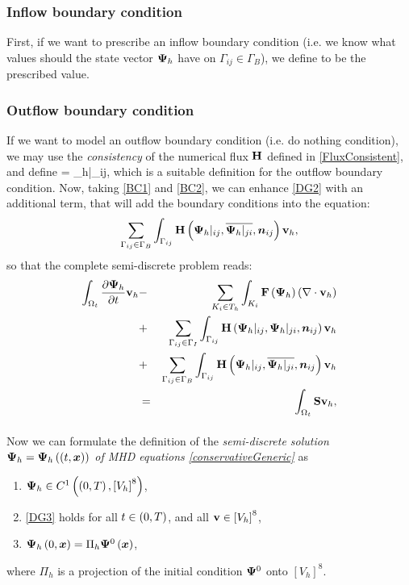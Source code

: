 \subsubsection{Inflow boundary condition}
First, if we want to prescribe an inflow boundary condition (i.e. we know what values should the state vector $\mathrm{\mathbf{\Psi}}_h$ have on ${\Gamma_{ij}}\in\Gamma_B$), we define
\be
\label{BC1} 
\ee
to be the prescribed value.

\subsubsection{Outflow boundary condition}
If we want to model an outflow boundary condition (i.e. do nothing condition), we may use the \textit{consistency} of the numerical flux $\mathrm{\mathbf{H}}$ defined in \ref{FluxConsistent}, and define
\be
\label{BC2}  = {\mrPsi_h}|_{ij},
\ee
which is a suitable definition for the outflow boundary condition.
Now, taking \ref{BC1} and \ref{BC2}, we can enhance \ref{DG2} with an additional term, that will add the boundary conditions into the equation:
$$
\sum_{\Gamma_{ij}\in\Gamma_B} \int_{\Gamma_{ij}} \mathrm{\mathbf{H}}\left({\mathrm{\mathbf{\Psi}}_h}|_{ij}, \overline{{\mathrm{\mathbf{\Psi}}_h}|_{ji}}, \mbox{\boldmath $n$}_{ij}\right) \mathrm{\mathbf{v}}_h,
$$
so that the complete semi-discrete problem reads:
\begin{eqnarray}
\label{DG3} \int_{\Omega_{t}} \frac{\partial{{\mathrm{\mathbf{\Psi}}_h}}}{\partial{t}} \mathrm{\mathbf{v}}_h & - & \sum_{K_i \in T_h}\int_{K_i}\mathrm{\mathbf{F}}\left({\mathrm{\mathbf{\Psi}}_h}\right) \left(\nabla \cdot \mathrm{\mathbf{v}}_h\right)\\ \nonumber & + & \sum_{\Gamma_{ij}\in\Gamma_I} \int_{\Gamma_{ij}} \mathrm{\mathbf{H}}\left({\mathrm{\mathbf{\Psi}}_h}|_{ij}, {\mathrm{\mathbf{\Psi}}_h}|_{ji}, \mbox{\boldmath $n$}_{ij}\right) \mathrm{\mathbf{v}}_h\\\nonumber
 & + & \sum_{\Gamma_{ij}\in\Gamma_B} \int_{\Gamma_{ij}} \mathrm{\mathbf{H}}\left({\mathrm{\mathbf{\Psi}}_h}|_{ij}, \overline{{\mathrm{\mathbf{\Psi}}_h}|_{ji}}, \mbox{\boldmath $n$}_{ij}\right) \mathrm{\mathbf{v}}_h\\\nonumber
 & = & \int_{\Omega_{t}} \mathrm{\mathbf{S}} \mathrm{\mathbf{v}}_h,
\end{eqnarray}

\paragraph{}
Now we can formulate the definition of the \textit{semi-discrete solution ${\mathrm{\mathbf{\Psi}}_h} = {\mathrm{\mathbf{\Psi}}_h}\left((t, \mbox{\boldmath $x$}\right))$ of MHD equations \ref{conservativeGeneric}} as
\begin{enumerate}
    \label{discreteSlnDef}
    \item ${\mathrm{\mathbf{\Psi}}_h} \in C^{1}\left(\left(0, T\right), \left[V_h\right]^8\right)$,
    \item \ref{DG3} holds for all $t\in\left(0, T\right)$, and all $\mathrm{\mathbf{v}}\in \left[V_h\right]^8$,
    \item ${\mathrm{\mathbf{\Psi}}_h}\left(0, \mbox{\boldmath $x$}\right) = \Pi_h \mathrm{\mathbf{\Psi}}^0\left(\mbox{\boldmath $x$}\right)$,
\end{enumerate}
where $\Pi_h$ is a projection of the initial condition $\mathrm{\mathbf{\Psi}}^0$ onto $\left[V_h\right]^8$.


